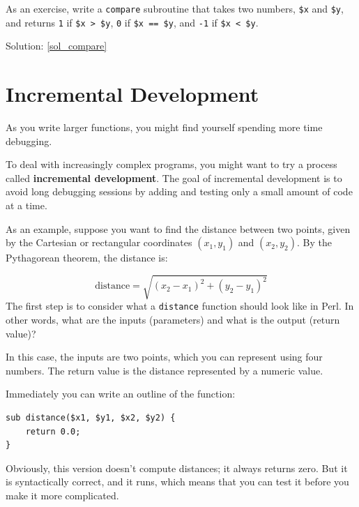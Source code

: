 \label{compare}
As an exercise, write a {\tt compare} subroutine that 
takes two numbers, {\tt \$x} and {\tt \$y}, and returns {\tt 1} 
if {\tt \$x > \$y}, {\tt 0} if {\tt \$x == \$y}, and 
{\tt -1} if {\tt \$x < \$y}.

Solution: \ref{sol_compare}


\section{Incremental Development}
\label{incremental.development}

As you write larger functions, you might find yourself
spending more time debugging.

To deal with increasingly complex programs,
you might want to try a process called
{\bf incremental development}.  The goal of incremental development
is to avoid long debugging sessions by adding and testing only
a small amount of code at a time.

As an example, suppose you want to find the distance between 
two points, given by the Cartesian or rectangular coordinates 
$(x_1, y_1)$ and $(x_2, y_2)$. By the Pythagorean theorem, 
the distance is:


\begin{displaymath}
\mathrm{distance} = \sqrt{(x_2 - x_1)^2 + (y_2 - y_1)^2}
\end{displaymath}
%
The first step is to consider what a {\tt distance} function should
look like in Perl.  In other words, what are the inputs (parameters)
and what is the output (return value)?

In this case, the inputs are two points, which you can represent
using four numbers.  The return value is the distance represented by
a numeric value.

Immediately you can write an outline of the function:

\begin{verbatim}
sub distance($x1, $y1, $x2, $y2) {
    return 0.0;
}
\end{verbatim}
%
Obviously, this version doesn't compute distances; it always returns
zero.  But it is syntactically correct, and it runs, which means that
you can test it before you make it more complicated.

